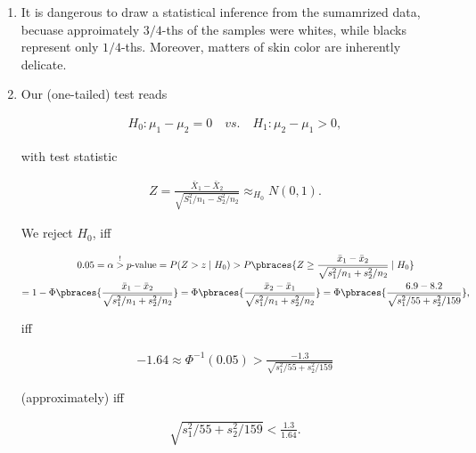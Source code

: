\begin{solution}

\phantom{}

\begin{enumerate}[label = (\alph*)]

    \item It is dangerous to draw a statistical inference from the sumamrized data, becuase approimately $3/4$-ths of the samples were whites, while blacks represent only $1/4$-ths.
    Moreover, matters of skin color are inherently delicate.

    \item Our (one-tailed) test reads
    
    \begin{align*}
        H_0: \mu_1 - \mu_2 = 0
        \quad
        \textit{vs.}
        \quad
        H_1: \mu_2 - \mu_1 > 0,
    \end{align*}

    with test statistic

    \begin{align*}
        Z = \frac{\bar X_1 - \bar X_2}{\sqrt{S_1^2 / n_1 - S_2^2 / n_2}} \approx_{H_0} N(0, 1).
    \end{align*}

    We reject $H_0$, iff

    \begin{multline*}
        0.05
        =
        \alpha
        \stackrel{!}{>}
        \text{$p$-value}
        =
        P(Z > z \mid H_0)
        >
        P \pbraces{Z \geq \frac{\bar x_1 - \bar x_2}{\sqrt{s_1^2 / n_1 + s_2^2 / n_2}} \mid H_0} \\
        =
        1 - \Phi \pbraces{\frac{\bar x_1 - \bar x_2}{\sqrt{s_1^2 / n_1 + s_2^2 / n_2}}}
        =
        \Phi \pbraces{\frac{\bar x_2 - \bar x_1}{\sqrt{s_1^2 / n_1 + s_2^2 / n_2}}}
        =
        \Phi \pbraces{\frac{6.9 - 8.2}{\sqrt{s_1^2 / 55 + s_2^2 / 159}}},
    \end{multline*}

    iff

    \begin{align*}
        -1.64
        \approx
        \Phi^{-1}(0.05)
        >
        \frac{-1.3}{\sqrt{s_1^2 / 55 + s_2^2 / 159}}
    \end{align*}

    (approximately) iff

    \begin{align*}
        \sqrt{s_1^2 / 55 + s_2^2 / 159}
        <
        \frac{1.3}{1.64}.
    \end{align*}


\end{enumerate}
\end{solution}
